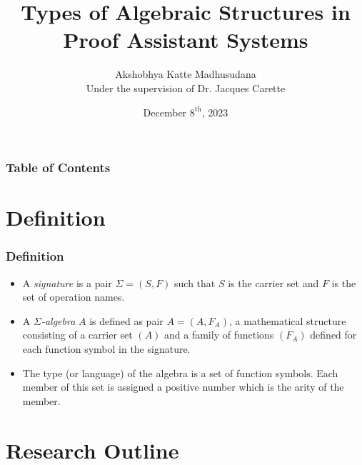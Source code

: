 \documentclass[xcolor={dvipsnames}]{beamer}
\title[Algebra in Proof Systems]{Types of Algebraic Structures in Proof Assistant Systems}
\author[Akshobhya K M]{Akshobhya Katte Madhusudana\\\small{}Under the supervision of Dr. Jacques Carette}
\institute[McMaster University]{McMaster University}
\date{December $8^{\text{th}}$, 2023}
\begin{document}
\frame{\titlepage}


\begin{frame}
\frametitle{Table of Contents}
\tableofcontents
\end{frame}

\section{Definition}

\begin{frame}
  \frametitle{Definition}

  \begin{itemize}

    \item A \textit{signature} is a pair $\Sigma = (S,F)$ such that $S$ is the
    carrier set and $F$ is the set of operation names.

    \item A \emph{$\Sigma$-algebra} $A$ is defined as pair $A = (A,F_A)$, a
    mathematical structure consisting of a carrier set $(A)$ and a family of
    functions $(F_A)$ defined for each function symbol in the signature.

    \item The type (or language) of the algebra is a set of function symbols.
    Each member of this set is assigned a positive number which is the arity of
    the member.
  \end{itemize}
\end{frame}

\section{Research Outline}
\end{document}
